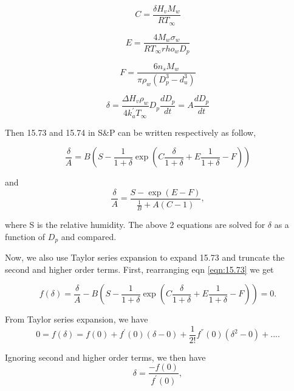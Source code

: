 \documentclass[12pt]{amsart}
\begin{document}
\begin{equation}
C=\frac{\delta H_{v} M_{w}}{R T_{\infty}}
\end{equation}

\begin{equation}
E=\frac{4 M_{w}\sigma_{w}}{R T_{\infty} rho_{w} D_{p}}
\end{equation}

\begin{equation}
F=\frac{6 n_{s} M_{w}}{\pi \rho_{w} (D_{p}^{3}-d_{u}^{3})}
\end{equation}

\begin{equation}\label{eqn:23}
\delta=\frac{\Delta H_{v} \rho_w}{4 k_a^{'} T_{\infty}} D_{p} \frac{d D_{p}}{dt}=A\frac{d D_{p}}{dt}
\end{equation}

Then 15.73 and 15.74 in S\&P can be written respectively as follow,

\begin{equation}\label{eqn:15.73}
\frac{\delta}{A}=B(S-\frac{1}{1+\delta}\exp(C\frac{\delta}{1+\delta}+E \frac{1}{1+\delta}-F))
\end{equation}

and 
\begin{equation}\label{eqn:15.74}
\frac{\delta}{A}=\frac{S-\exp(E-F)}{\frac{1}{B}+A(C-1)},
\end{equation}

where S is the relative humidity. The above 2 equations are solved for $\delta$ as a function of $D_{p}$ and compared. 

Now, we also use Taylor series expansion to expand 15.73 and truncate the second and higher order terms. First, rearranging  eqn \ref{eqn:15.73} we get


\begin{equation}
f(\delta)=\frac{\delta}{A}-B(S-\frac{1}{1+\delta}\exp(C\frac{\delta}{1+\delta}+E \frac{1}{1+\delta}-F))=0.
\end{equation}

From Taylor series expansion, we have
\begin{equation}
0=f(\delta)=f(0)+f^{'}(0)(\delta-0)+\frac{1}{2!}f^{''}(0)(\delta^{2}-0)+....
\end{equation}

Ignoring second and higher order terms, we then have
\begin{equation}
\delta=\frac{-f(0)}{f^{'}(0)},
\end{equation}
\end{document}
